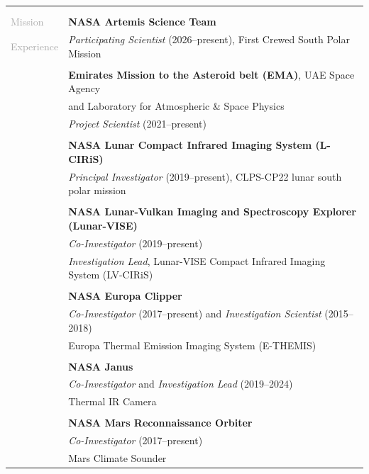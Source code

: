 \documentclass[letterpaper,10pt,twoside]{article}
\begin{document}
\begin{tabular}{@{} l l}
     & \\
     & \\
 \large{\textcolor{darkgray}{Mission}}    & \textbf{NASA Artemis Science Team}\\
 \large{\textcolor{darkgray}{Experience}} & \textit{Participating Scientist} (2026--present), First Crewed South Polar Mission\\
     & \\
     & \textbf{Emirates Mission to the Asteroid belt (EMA)}, UAE Space Agency\\
     & and Laboratory for Atmospheric \& Space Physics \\
     & \textit{Project Scientist} (2021--present)\\
     & \\
     & \textbf{NASA Lunar Compact Infrared Imaging System (L-CIRiS)}\\
     & \textit{Principal Investigator} (2019--present), CLPS-CP22 lunar south polar mission\\
     & \\
     & \textbf{NASA Lunar-Vulkan Imaging and Spectroscopy Explorer (Lunar-VISE)}\\
     & \textit{Co-Investigator} (2019--present)\\
     & \textit{Investigation Lead}, Lunar-VISE Compact Infrared Imaging System (LV-CIRiS)\\
     & \\
     & \textbf{NASA Europa Clipper}\\
     & \textit{Co-Investigator} (2017--present) and \textit{Investigation Scientist} (2015--2018)\\
     & Europa Thermal Emission Imaging System (E-THEMIS)\\
     & \\
     & \textbf{NASA Janus}\\
     & \textit{Co-Investigator} and \textit{Investigation Lead} (2019--2024)\\
     & Thermal IR Camera\\
     &\\
     & \textbf{NASA Mars Reconnaissance Orbiter} \\
     & \textit{Co-Investigator} (2017--present) \\
     & Mars Climate Sounder \\
\end{tabular}

\end{document}
